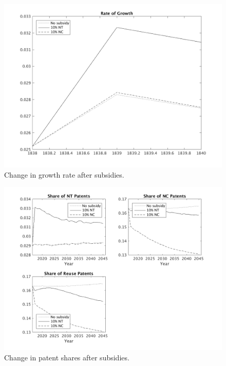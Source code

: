 \documentclass[serif]{article}
\theoremstyle{definition}
\begin{document}
\begin{figure}[h!]
\centering
\includegraphics[width=\textwidth]{figures/growth_subs.png}
\caption{Change in growth rate after subsidies.}
\end{figure}

\begin{figure}[h!]
\centering
\includegraphics[width=\textwidth]{figures/patent_subs.png}
\caption{Change in patent shares after subsidies.}
\end{figure}
\end{document}

